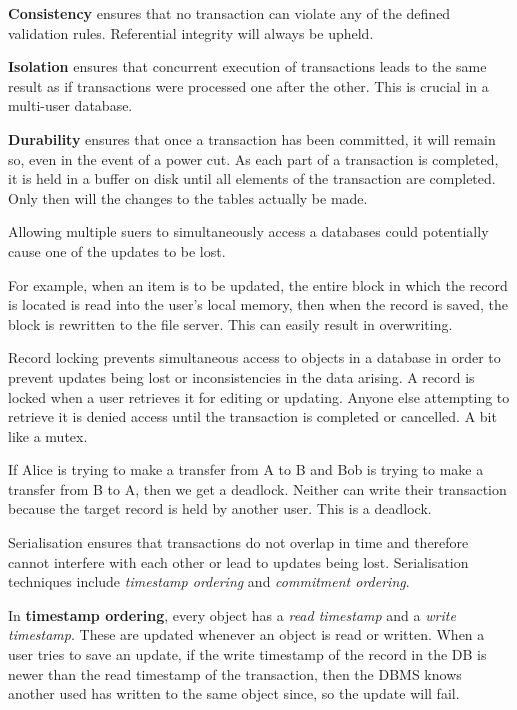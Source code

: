 \documentclass[../main.tex]{subfile}
\begin{document}
\textbf{Consistency} ensures that no transaction can violate any of the defined validation rules. Referential integrity will always be upheld.

\textbf{Isolation} ensures that concurrent execution of transactions leads to the same result as if transactions were processed one after the other. This is crucial in a multi-user database.

\textbf{Durability} ensures that once a transaction has been committed, it will remain so, even in the event of a power cut. As each part of a transaction is completed, it is held in a buffer on disk until all elements of the transaction are completed. Only then will the changes to the tables actually be made.


Allowing multiple suers to simultaneously access a databases could potentially cause one of the updates to be lost.

For example, when an item is to be updated, the entire block in which the record is located is read into the user's local memory, then when the record is saved, the block is rewritten to the file server. This can easily result in overwriting.

Record locking prevents simultaneous access to objects in a database in order to prevent updates being lost or inconsistencies in the data arising. A record is locked when a user retrieves it for editing or updating. Anyone else attempting to retrieve it is denied access until the transaction is completed or cancelled. A bit like a mutex.

If Alice is trying to make a transfer from A to B and Bob is trying to make a transfer from B to A, then we get a deadlock. Neither can write their transaction because the target record is held by another user. This is a deadlock.


Serialisation ensures that transactions do not overlap in time and therefore cannot interfere with each other or lead to updates being lost. Serialisation techniques include \textit{timestamp ordering} and \textit{commitment ordering}.

In \textbf{timestamp ordering}, every object has a \textit{read timestamp} and a \textit{write timestamp}. These are updated whenever an object is read or written. When a user tries to save an update, if the write timestamp of the record in the DB is newer than the read timestamp of the transaction, then the DBMS knows another used has written to the same object since, so the update will fail.
\end{document}
